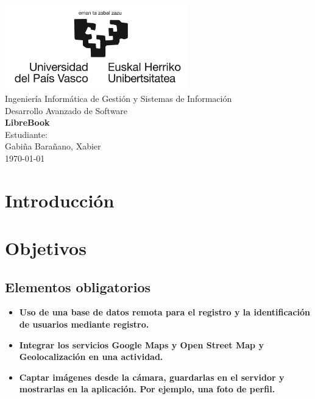 \documentclass[a4paper,10pt]{report}
\begin{document}
  \begin{titlepage}
      \centering
      \includegraphics[width=0.6\textwidth]{./.img/logo.jpg}\\
      \vspace{1cm}
      \Large Ingeniería Informática de Gestión y Sistemas de Información\\
      \vspace{3cm}
      \Huge Desarrollo Avanzado de Software\\
      \vspace{0.5cm}
      \huge \textbf{LibreBook}\\
      \vspace{7.5cm}
      \Large Estudiante:\\
      \vspace{0.2cm}
      \large Gabiña Barañano, Xabier\\
      \vspace{1cm}
      \vfill
      \today
  \end{titlepage}
  \tableofcontents
  \listoffigures
  \chapter{Introducción}
    
  \chapter{Objetivos}
    \section{Elementos obligatorios}
      \begin{itemize}
        \item \textbf{Uso de una base de datos remota para el registro y la identificación de usuarios mediante registro.}
        \item \textbf{Integrar los servicios Google Maps y Open Street Map y Geolocalización en una actividad.}
        \item \textbf{Captar imágenes desde la cámara, guardarlas en el servidor y mostrarlas en la aplicación. Por ejemplo, una foto de perfil.}
      \end{itemize}
\end{document}
